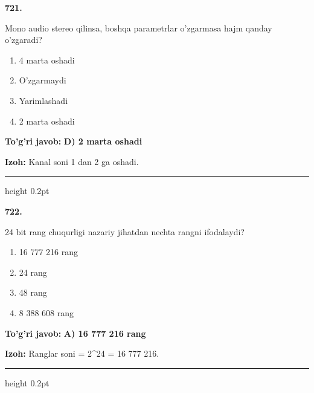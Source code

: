 \documentclass[10pt,a4paper,oneside]{article}
\begin{document}
\noindent\textbf{\color{ink}721.}
\par
Mono audio stereo qilinsa, boshqa parametrlar o'zgarmasa hajm qanday o'zgaradi?
\begin{enumerate}[label=\Alph*),leftmargin=9mm]
\item 4 marta oshadi
\item O'zgarmaydi
\item Yarimlashadi
\item 2 marta oshadi
\end{enumerate}
\begin{tcolorbox}[enhanced,breakable,colback=teal!4,colframe=teal!50!black,boxrule=0.5pt,arc=1.1mm,left=3mm,right=3mm,top=1.7mm,bottom=1.7mm,before skip=2mm,after skip=2mm]
\textbf{\color{teal}To'g'ri javob:} \textbf{D) 2 marta oshadi}
\par\smallskip
\textbf{Izoh:} Kanal soni 1 dan 2 ga oshadi.
\end{tcolorbox}
\vspace{2mm}\hrule height 0.2pt \vspace{3mm}

\noindent\textbf{\color{ink}722.}
\par
24 bit rang chuqurligi nazariy jihatdan nechta rangni ifodalaydi?
\begin{enumerate}[label=\Alph*),leftmargin=9mm]
\item 16 777 216 rang
\item 24 rang
\item 48 rang
\item 8 388 608 rang
\end{enumerate}
\begin{tcolorbox}[enhanced,breakable,colback=teal!4,colframe=teal!50!black,boxrule=0.5pt,arc=1.1mm,left=3mm,right=3mm,top=1.7mm,bottom=1.7mm,before skip=2mm,after skip=2mm]
\textbf{\color{teal}To'g'ri javob:} \textbf{A) 16 777 216 rang}
\par\smallskip
\textbf{Izoh:} Ranglar soni = 2\textasciicircum{}24 = 16 777 216.
\end{tcolorbox}
\vspace{2mm}\hrule height 0.2pt \vspace{3mm}
\end{document}
